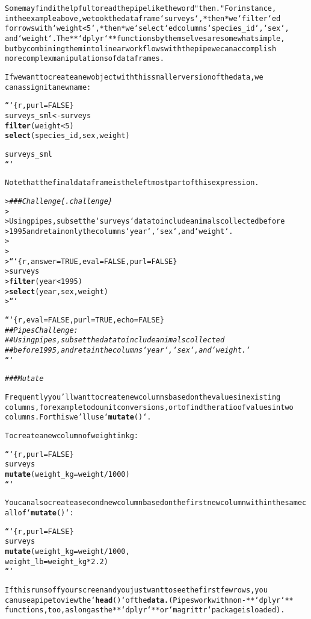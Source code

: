 \documentclass{article}\usepackage[]{graphicx}\usepackage[]{xcolor}
\makeatletter
\newcommand{\hlstr}[1]{\textcolor[rgb]{0.192,0.494,0.8}{#1}}%
\newcommand{\hlcom}[1]{\textcolor[rgb]{0.678,0.584,0.686}{\textit{#1}}}%
\newcommand{\hlkwd}[1]{\textcolor[rgb]{0.737,0.353,0.396}{\textbf{#1}}}%
\newenvironment{kframe}{%
 \def\at@end@of@kframe{}%
 \ifinner\ifhmode%
  \def\at@end@of@kframe{\end{minipage}}%
  \begin{minipage}{\columnwidth}%
 \fi\fi%
 \def\FrameCommand##1{\hskip\@totalleftmargin \hskip-\fboxsep
 \colorbox{shadecolor}{##1}\hskip-\fboxsep
     \hskip-\linewidth \hskip-\@totalleftmargin \hskip\columnwidth}%
 \MakeFramed {\advance\hsize-\width
   \@totalleftmargin\z@ \linewidth\hsize
   \@setminipage}}%
 {\par\unskip\endMakeFramed%
 \at@end@of@kframe}
\newenvironment{knitrout}{}{} %
\makeatother
\begin{document}
\begin{knitrout}
\begin{kframe}
\begin{alltt}
Some may find it helpful to read the pipe like the word \hlstr{"then."} For instance,
in the example above, we took the data frame `surveys`, *then* we `filter`ed
for rows with `weight < 5`, *then* we `select`ed columns `species_id`, `sex`,
and `weight`. The **`dplyr`** functions by themselves are somewhat simple,
but by combining them into linear workflows with the pipe we can accomplish
more complex manipulations of data frames.

If we want to create a new object with this smaller version of the data, we
can assign it a new name:

```\{r, purl = FALSE\}
surveys_sml <- surveys %>%
  \hlkwd{filter}(weight < 5) %>%
  \hlkwd{select}(species_id, sex, weight)

surveys_sml
```

Note that the final data frame is the leftmost part of this expression.

> \hlcom{### Challenge \{.challenge\}}
>
>  Using pipes, subset the `surveys` data to include animals collected before
>  1995 and retain only the columns `year`, `sex`, and `weight`.
>
>
> ```\{r, answer=TRUE, eval=FALSE, purl=FALSE\}
> surveys %>%
>     \hlkwd{filter}(year < 1995) %>%
>     \hlkwd{select}(year, sex, weight)
> ```

```\{r, eval=FALSE, purl=TRUE, echo=FALSE\}
\hlcom{## Pipes Challenge:}
\hlcom{##  Using pipes, subset the data to include animals collected}
\hlcom{##  before 1995, and retain the columns `year`, `sex`, and `weight.`}
```

\hlcom{### Mutate}

Frequently you'll want to create new columns based on the values in existing
columns, for example to do unit conversions, or to find the ratio of values in two
columns. For this we'll use `\hlkwd{mutate}()`.

To create a new column of weight in kg:

```\{r, purl = FALSE\}
surveys %>%
  \hlkwd{mutate}(weight_kg = weight / 1000)
```

You can also create a second new column based on the first new column within the same call of `\hlkwd{mutate}()`:

```\{r, purl = FALSE\}
surveys %>%
  \hlkwd{mutate}(weight_kg = weight / 1000,
         weight_lb = weight_kg * 2.2)
```

If this runs off your screen and you just want to see the first few rows, you
can use a pipe to view the `\hlkwd{head}()` of the \hlkwd{data.} (Pipes work with non-**`dplyr`**
functions, too, as long as the **`dplyr`** or `magrittr` package is loaded).


\end{alltt}
\end{kframe}
\end{knitrout}
\end{document}
